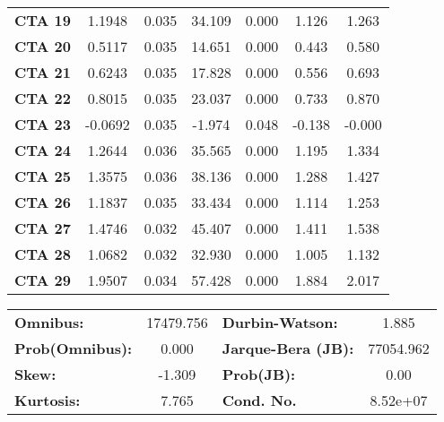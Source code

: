 \documentclass{article}
\begin{document}
\begin{center}
\begin{tabular}{lcccccc}
\textbf{CTA 19}   &       1.1948  &        0.035     &    34.109  &         0.000        &        1.126    &        1.263     \\
\textbf{CTA 20}   &       0.5117  &        0.035     &    14.651  &         0.000        &        0.443    &        0.580     \\
\textbf{CTA 21}   &       0.6243  &        0.035     &    17.828  &         0.000        &        0.556    &        0.693     \\
\textbf{CTA 22}   &       0.8015  &        0.035     &    23.037  &         0.000        &        0.733    &        0.870     \\
\textbf{CTA 23}   &      -0.0692  &        0.035     &    -1.974  &         0.048        &       -0.138    &       -0.000     \\
\textbf{CTA 24}   &       1.2644  &        0.036     &    35.565  &         0.000        &        1.195    &        1.334     \\
\textbf{CTA 25}   &       1.3575  &        0.036     &    38.136  &         0.000        &        1.288    &        1.427     \\
\textbf{CTA 26}   &       1.1837  &        0.035     &    33.434  &         0.000        &        1.114    &        1.253     \\
\textbf{CTA 27}   &       1.4746  &        0.032     &    45.407  &         0.000        &        1.411    &        1.538     \\
\textbf{CTA 28}   &       1.0682  &        0.032     &    32.930  &         0.000        &        1.005    &        1.132     \\
\textbf{CTA 29}   &       1.9507  &        0.034     &    57.428  &         0.000        &        1.884    &        2.017     \\
\bottomrule
\end{tabular}
\begin{tabular}{lclc}
\textbf{Omnibus:}       & 17479.756 & \textbf{  Durbin-Watson:     } &     1.885  \\
\textbf{Prob(Omnibus):} &    0.000  & \textbf{  Jarque-Bera (JB):  } & 77054.962  \\
\textbf{Skew:}          &   -1.309  & \textbf{  Prob(JB):          } &      0.00  \\
\textbf{Kurtosis:}      &    7.765  & \textbf{  Cond. No.          } &  8.52e+07  \\
\bottomrule
\end{tabular}
\end{center}
\end{document}

